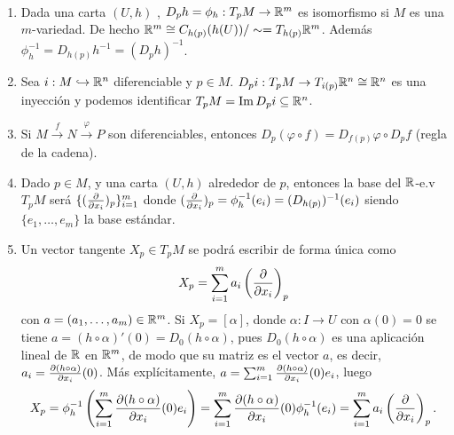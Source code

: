\documentclass[CV.tex]{subfiles}
\begin{document}
\begin{nota}\
\begin{enumerate}
\item Dada una carta $(U,h)$ , $D_ph=\phi_h:T_pM\to\mathbb{R}^m$ es isomorfismo si $M$ es una $m$-variedad. De hecho $\mathbb{R}^m\cong C_{h(p)}(h(U))/\sim =T_{h(p)}\mathbb{R}^m$. Además $\phi^{-1}_h=D_{h(p)}h^{-1}=(D_{p}h)^{-1}$.
\item Sea $i:M\hookrightarrow \mathbb{R}^n$ diferenciable y $p\in M$. $D_pi:T_pM\to T_{i(p)}\mathbb{R}^n\cong\mathbb{R}^n$ es una inyección y podemos identificar $T_pM=\operatorname{Im} D_pi\subseteq\mathbb{R}^n$. 
\item Si $M\overset{f}{\to}N\overset{\varphi}{\to}P$ son diferenciables, entonces $D_p(\varphi\circ f)=D_{f(p)}\varphi\circ D_pf$ (regla de la cadena).
\item Dado $p\in M$, y una carta $(U,h)$ alrededor de $p$, entonces la base del $\mathbb{R}$-e.v $T_pM$ será $\{(\frac{\partial }{\partial x_i})_p\}_{i=1
}^m$ donde $(\frac{\partial }{\partial x_i})_p=\phi^{-1}_h(e_i)=(D_{h(p)})^{-1}(e_i)$ siendo $\{e_1,\dots, e_m\}$ la base estándar.
\item Un vector tangente $X_p\in T_pM$ se podrá escribir de forma única como
\begin{equation}\label{coord}
X_p=\sum_{i=1}^m a_i\left(\frac{\partial }{\partial x_i}\right)_p
\end{equation}
con $a=(a_1,\dots, a_m)\in\mathbb{R}^m$. Si $X_p=[\alpha]$, donde $\alpha:I\to U$ con $\alpha(0)=0$ se tiene $a=(h\circ \alpha)'(0)=D_0(h\circ\alpha)$, pues $D_0(h\circ\alpha)$ es una aplicación lineal de $\mathbb{R}$ en $\mathbb{R}^m$, de modo que su matriz es el vector $a$, es decir, $a_i=\frac{\partial (h\circ\alpha)}{\partial x_i}(0)$. Más explícitamente, $a=\sum_{i=1}^m \frac{\partial (h\circ\alpha)}{\partial x_i}(0)e_i$, luego 
\[
X_p=\phi_h^{-1}\left(\sum_{i=1}^m \frac{\partial (h\circ\alpha)}{\partial x_i}(0)e_i \right)=\sum_{i=1}^m \frac{\partial (h\circ\alpha)}{\partial x_i}(0)\phi_h^{-1}(e_i)=\sum_{i=1}^m a_i\left(\frac{\partial }{\partial x_i}\right)_p.
\]


\end{enumerate}
\end{nota}
\end{document}
